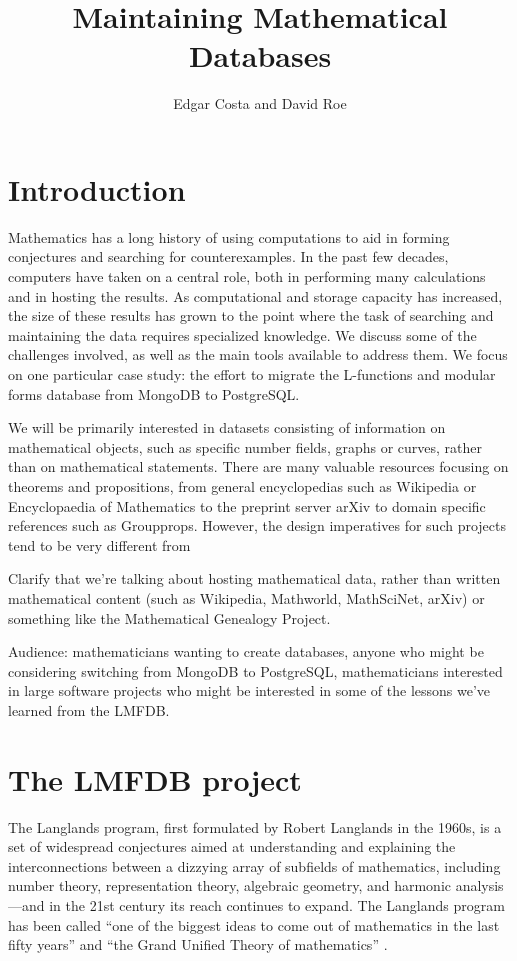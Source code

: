 \documentclass{article}
\title{Maintaining Mathematical Databases}
\author{Edgar Costa and David Roe}
\newcommand{\todoinline}[1]{\todo[inline]{#1}}
\begin{document}
\maketitle

\section{Introduction}

Mathematics has a long history of using computations to aid in forming conjectures and searching for counterexamples.
In the past few decades, computers have taken on a central role, both in performing many calculations and in hosting the results.
As computational and storage capacity has increased, the size of these results has grown to the point where the task of searching and maintaining the data requires specialized knowledge.
We discuss some of the challenges involved, as well as the main tools available to address them.
We focus on one particular case study: the effort to migrate the L-functions and modular forms database from MongoDB to PostgreSQL.

We will be primarily interested in datasets consisting of information on mathematical objects, such as specific number fields, graphs or curves, rather than on mathematical statements.
There are many valuable resources focusing on theorems and propositions, from general encyclopedias such as Wikipedia or Encyclopaedia of Mathematics to the preprint server arXiv to domain specific references such as Groupprops. 
However, the design imperatives for such projects tend to be very different from  

Clarify that we're talking about hosting mathematical data, rather than written mathematical content (such as Wikipedia, Mathworld, MathSciNet, arXiv) or something like the Mathematical Genealogy Project.

Audience: mathematicians wanting to create databases, anyone who might be considering switching from MongoDB to PostgreSQL, mathematicians interested in large software projects who might be interested in some of the lessons we've learned from the LMFDB.

\todoinline{mention search by content}

\section{The LMFDB project}
The Langlands program, first formulated by Robert Langlands in the 1960s, is a set of widespread conjectures aimed at understanding and explaining the interconnections between a dizzying array of subfields of mathematics, including number theory, representation theory, algebraic geometry, and harmonic analysis---and in the 21st century its reach continues to expand.
The Langlands program has been called ``one of the biggest ideas to come out of mathematics in the last fifty years'' and ``the Grand Unified Theory of mathematics'' \cite[p. 3]{frenkel}.
\end{document}
